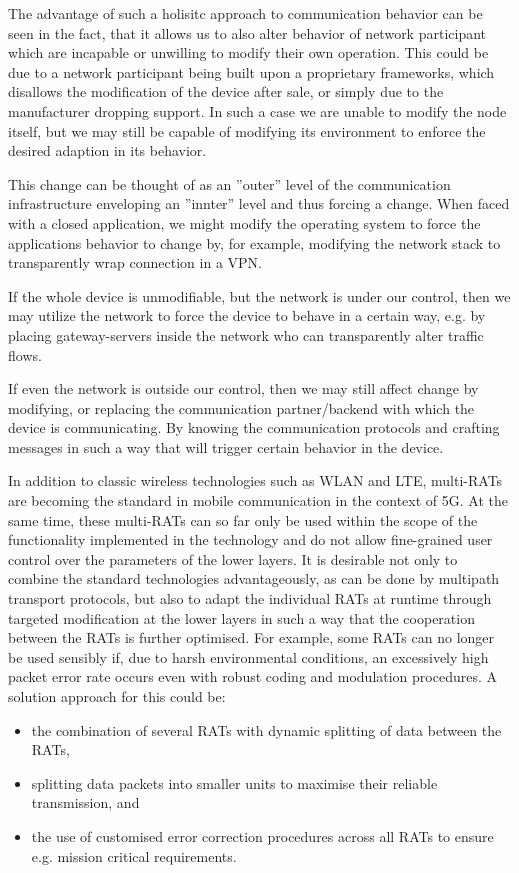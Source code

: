 The advantage of such a holisitc approach to communication behavior can be seen in the fact, that it allows us to also alter behavior of network participant which are incapable or unwilling to modify their own operation.
This could be due to a network participant being built upon a proprietary frameworks, which disallows the modification of the device after sale, or simply due to the manufacturer dropping support.
In such a case we are unable to modify the node itself, but we may still be capable of modifying its environment to enforce the desired adaption in its behavior.

This change can be thought of as an ''outer'' level of the communication infrastructure enveloping an ''innter'' level and thus forcing a change.
When faced with a closed application, we might modify the operating system to force the applications behavior to change by, for example, modifying the network stack to transparently wrap connection in a VPN.

If the whole device is unmodifiable, but the network is under our control, then we may utilize the network  to force the device to behave in a certain way, e.g. by placing gateway-servers inside  the network who can transparently alter traffic flows.

If even the network is outside our control, then we may still affect change by modifying, or replacing the communication partner/backend with which the device is communicating.
By knowing the communication protocols and crafting messages in such a way that will trigger certain behavior in the device.

In addition to classic wireless technologies such as WLAN and LTE, multi-RATs are becoming the standard in mobile communication in the context of 5G. 
At the same time, these multi-RATs can so far only be used within the scope of the functionality implemented in the technology and do not allow fine-grained user control over the parameters of the lower layers.
It is desirable not only to combine the standard technologies advantageously, as can be done by multipath transport protocols, but also to adapt the individual RATs at runtime through targeted modification at the lower layers in such a way that the cooperation between the RATs is further optimised. 
For example, some RATs can no longer be used sensibly if, due to harsh environmental conditions, an excessively high packet error rate occurs even with robust coding and modulation procedures. A solution approach for this could be:
\begin{itemize}
\item the combination of several RATs with dynamic splitting of data between the RATs,
\item splitting data packets into smaller units to maximise their reliable transmission, and 
\item the use of customised error correction procedures across all RATs to ensure e.g. mission critical requirements.
\end{itemize}

